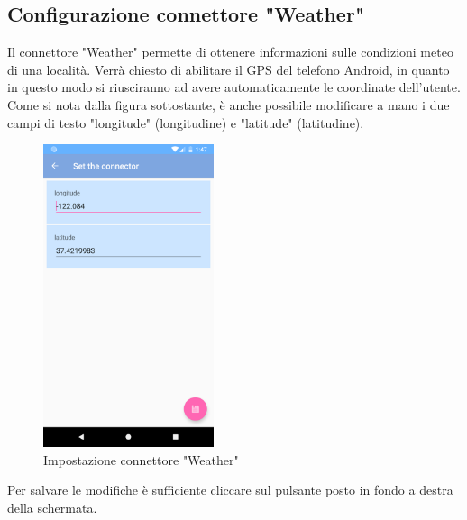 \subsection{Configurazione connettore "Weather"}
Il connettore "Weather" permette di ottenere informazioni sulle condizioni meteo di una località. Verrà chiesto di abilitare il GPS del telefono Android, in quanto in questo modo si riusciranno ad avere automaticamente le coordinate dell'utente.
Come si nota dalla figura sottostante, è anche possibile modificare a mano i due campi di testo "longitude" (longitudine) e "latitude" (latitudine).
\begin{figure}[H]
	\centering
	\includegraphics[width=5cm]{../includes/pics/configurazione_connettore_weather.png}
	\caption{\label{fig:configurazione_connettore_weather}Impostazione connettore "Weather"}
\end{figure}
Per salvare le modifiche è sufficiente cliccare sul pulsante posto in fondo a destra della schermata.

